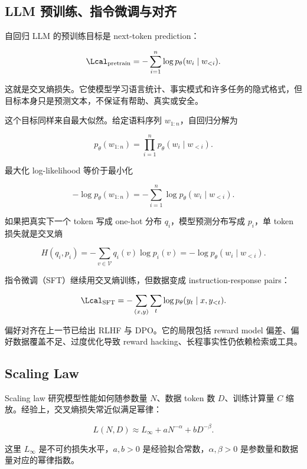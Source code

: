 \subsection{LLM 预训练、指令微调与对齐}


自回归 LLM 的预训练目标是 next-token prediction：

\[
  \Lcal_{\mathrm{pretrain}}
  =
  -
  \sum_{i=1}^{n}
  \log p_\theta(w_i\mid w_{<i}).
\]

这就是交叉熵损失。它使模型学习语言统计、事实模式和许多任务的隐式格式，但目标本身只是预测文本，不保证有帮助、真实或安全。

这个目标同样来自最大似然。给定语料序列 \(w_{1:n}\)，自回归分解为

\[
  p_\theta(w_{1:n})
  =
  \prod_{i=1}^{n}p_\theta(w_i\mid w_{<i}).
\]

最大化 log-likelihood 等价于最小化

\[
  -\log p_\theta(w_{1:n})
  =
  -
  \sum_{i=1}^{n}
  \log p_\theta(w_i\mid w_{<i}).
\]

如果把真实下一个 token 写成 one-hot 分布 \(q_i\)，模型预测分布写成 \(p_i\)，单 token 损失就是交叉熵

\[
  H(q_i,p_i)
  =
  -
  \sum_{v\in\mathcal{V}}q_i(v)\log p_i(v)
  =
  -\log p_\theta(w_i\mid w_{<i}).
\]

指令微调（SFT）继续用交叉熵训练，但数据变成 instruction-response pairs：

\[
  \Lcal_{\mathrm{SFT}}
  =
  -
  \sum_{(x,y)}
  \sum_{t}
  \log p_\theta(y_t\mid x,y_{<t}).
\]

偏好对齐在上一节已给出 RLHF 与 DPO。它的局限包括 reward model 偏差、偏好数据覆盖不足、过度优化导致 reward hacking、长程事实性仍依赖检索或工具。

\subsection{Scaling Law}


Scaling law 研究模型性能如何随参数量 \(N\)、数据 token 数 \(D\)、训练计算量 \(C\) 缩放。经验上，交叉熵损失常近似满足幂律：

\[
  L(N,D)
  \approx
  L_\infty
  +
  aN^{-\alpha}
  +
  bD^{-\beta}.
\]

这里 \(L_\infty\) 是不可约损失水平，\(a,b>0\) 是经验拟合常数，\(\alpha,\beta>0\) 是参数量和数据量对应的幂律指数。


